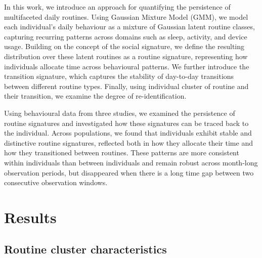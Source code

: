 \documentclass[pdflatex,sn-vancouver,Numbered]{bst/sn-jnl}%
\theoremstyle{thmstyleone}%
\theoremstyle{thmstyletwo}%
\theoremstyle{thmstylethree}%
\begin{document}

In this work, we introduce an approach for quantifying the persistence of multifaceted daily routines. Using Gaussian Mixture Model (GMM), we model each individual’s daily behaviour as a mixture of Gaussian latent routine classes, capturing recurring patterns across domains such as sleep, activity, and device usage. Building on the concept of the social signature, we define the resulting distribution over these latent routines as a routine signature, representing how individuals allocate time across behavioural patterns. We further introduce the transition signature, which captures the stability of day-to-day transitions between different routine types. Finally, using individual cluster of routine and their transition, we examine the degree of re-identification.

Using behavioural data from three studies, we examined the persistence of routine signatures and investigated how these signatures can be traced back to the individual. Across populations, we found that individuals exhibit stable and distinctive routine signatures, reflected both in how they allocate their time and how they transitioned between routines. These patterns are more consistent within individuals than between individuals and remain robust across month-long observation periods, but disappeared when there is a long time gap between two consecutive observation windows. 

\section*{Results}\label{sec:results}  

\subsection*{Routine cluster characteristics}\label{sec:results:cluster}
\end{document}

